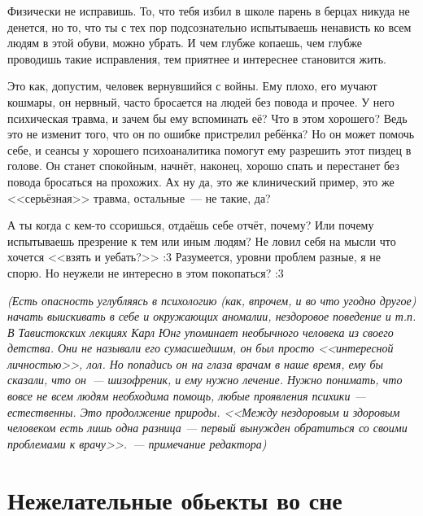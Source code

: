 \documentclass[a4paper,14pt,oneside]{memoir}
\begin{document}
Физически не исправишь. То, что тебя избил в школе парень в берцах никуда не денется, но то, что ты с тех пор подсознательно испытываешь ненависть ко всем людям в этой обуви, можно убрать. И чем глубже копаешь, чем глубже проводишь такие исправления, тем приятнее и интереснее становится жить.

Это как, допустим, человек вернувшийся с войны. Ему плохо, его мучают кошмары, он нервный, часто бросается на людей без повода и прочее. У него психическая травма, и зачем бы ему вспоминать её? Что в этом хорошего? Ведь это не изменит того, что он по ошибке пристрелил ребёнка? Но он может помочь себе, и сеансы у хорошего психоаналитика помогут ему разрешить этот пиздец в голове. Он станет спокойным, начнёт, наконец, хорошо спать и перестанет без повода бросаться на прохожих. Ах ну да, это же клинический пример, это же <<серьёзная>> травма, остальные~--- не такие, да? 

А ты когда с кем-то ссоришься, отдаёшь себе отчёт, почему? Или почему испытываешь презрение к тем или иным людям? Не ловил себя на мысли что хочется <<взять и уебать?>> :3 
Разумеется, уровни проблем разные, я не спорю. Но неужели не интересно в этом покопаться? :3

\textit{(Есть опасность углубляясь в психологию (как, впрочем, и во что угодно другое) начать выискивать в себе и окружающих аномалии, нездоровое поведение и т.п. В Тавистокских лекциях Карл Юнг упоминает необычного человека из своего детства. Они не называли его сумасшедшим, он был просто <<интересной личностью>>, лол. Но попадись он на глаза врачам в наше время, ему бы сказали, что он~--- шизофреник, и ему нужно лечение. Нужно понимать, что вовсе не всем людям необходима помощь, любые проявления психики — естественны. Это продолжение природы. <<Между нездоровым и здоровым человеком есть лишь одна разница — первый вынужден обратиться со своими проблемами к врачу>>.~--- примечание редактора)}




\section{Нежелательные обьекты во сне}

\end{document}
